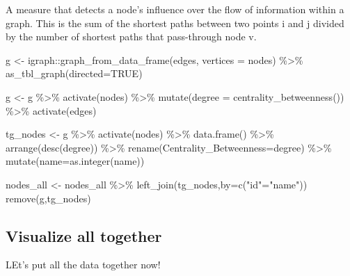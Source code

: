 \documentclass[
]{article}
\newenvironment{Shaded}{\begin{snugshade}}{\end{snugshade}}
\newcommand{\AttributeTok}[1]{\textcolor[rgb]{0.77,0.63,0.00}{#1}}
\newcommand{\ConstantTok}[1]{\textcolor[rgb]{0.00,0.00,0.00}{#1}}
\newcommand{\FunctionTok}[1]{\textcolor[rgb]{0.00,0.00,0.00}{#1}}
\newcommand{\NormalTok}[1]{#1}
\newcommand{\OtherTok}[1]{\textcolor[rgb]{0.56,0.35,0.01}{#1}}
\newcommand{\SpecialCharTok}[1]{\textcolor[rgb]{0.00,0.00,0.00}{#1}}
\newcommand{\StringTok}[1]{\textcolor[rgb]{0.31,0.60,0.02}{#1}}
\begin{document}
A measure that detects a node's influence over the flow of information
within a graph. This is the sum of the shortest paths between two points
i and j divided by the number of shortest paths that pass-through node
v.

\begin{Shaded}
\begin{Highlighting}[]
\NormalTok{g }\OtherTok{\textless{}{-}}\NormalTok{ igraph}\SpecialCharTok{::}\FunctionTok{graph\_from\_data\_frame}\NormalTok{(edges, }\AttributeTok{vertices =}\NormalTok{ nodes) }\SpecialCharTok{\%\textgreater{}\%} \FunctionTok{as\_tbl\_graph}\NormalTok{(}\AttributeTok{directed=}\ConstantTok{TRUE}\NormalTok{)}

\NormalTok{g }\OtherTok{\textless{}{-}}\NormalTok{ g }\SpecialCharTok{\%\textgreater{}\%} 
  \FunctionTok{activate}\NormalTok{(nodes) }\SpecialCharTok{\%\textgreater{}\%} 
  \FunctionTok{mutate}\NormalTok{(}\AttributeTok{degree =} \FunctionTok{centrality\_betweenness}\NormalTok{()) }\SpecialCharTok{\%\textgreater{}\%} 
  \FunctionTok{activate}\NormalTok{(edges)}

\NormalTok{tg\_nodes }\OtherTok{\textless{}{-}}
\NormalTok{  g }\SpecialCharTok{\%\textgreater{}\%}
  \FunctionTok{activate}\NormalTok{(nodes) }\SpecialCharTok{\%\textgreater{}\%}
  \FunctionTok{data.frame}\NormalTok{() }\SpecialCharTok{\%\textgreater{}\%}
  \FunctionTok{arrange}\NormalTok{(}\FunctionTok{desc}\NormalTok{(degree)) }\SpecialCharTok{\%\textgreater{}\%}
  \FunctionTok{rename}\NormalTok{(}\AttributeTok{Centrality\_Betweenness=}\NormalTok{degree) }\SpecialCharTok{\%\textgreater{}\%}
  \FunctionTok{mutate}\NormalTok{(}\AttributeTok{name=}\FunctionTok{as.integer}\NormalTok{(name))}

\NormalTok{nodes\_all }\OtherTok{\textless{}{-}}\NormalTok{ nodes\_all }\SpecialCharTok{\%\textgreater{}\%}
  \FunctionTok{left\_join}\NormalTok{(tg\_nodes,}\AttributeTok{by=}\FunctionTok{c}\NormalTok{(}\StringTok{"id"}\OtherTok{=}\StringTok{"name"}\NormalTok{)) }
\FunctionTok{remove}\NormalTok{(g,tg\_nodes)}
\end{Highlighting}
\end{Shaded}

\hypertarget{visualize-all-together}{%
\subsection{Visualize all together}\label{visualize-all-together}}

LEt's put all the data together now!
\end{document}
